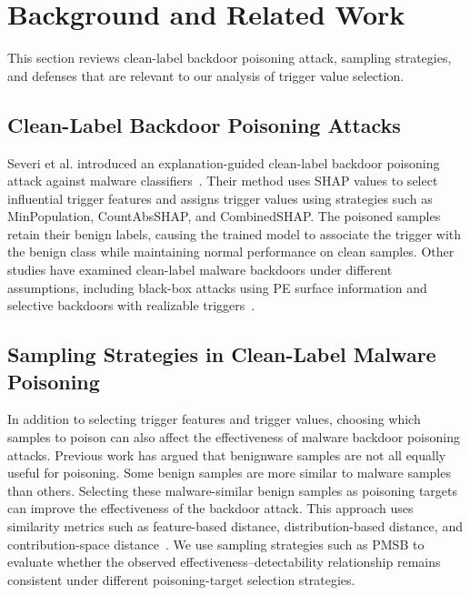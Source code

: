 \section{Background and Related Work}
This section reviews clean-label backdoor poisoning attack, sampling strategies, and defenses that are relevant to our analysis of trigger value selection.

\subsection{Clean-Label Backdoor Poisoning Attacks}
Severi et al. introduced an explanation-guided clean-label backdoor poisoning attack against malware classifiers~\cite{severi}.
Their method uses SHAP values to select influential trigger features and assigns trigger values using strategies such as MinPopulation, CountAbsSHAP, and CombinedSHAP.
The poisoned samples retain their benign labels, causing the trained model to associate the trigger with the benign class while maintaining normal performance on clean samples.
Other studies have examined clean-label malware backdoors under different assumptions, including black-box attacks using PE surface information and selective backdoors with realizable triggers~\cite{zheng_clean_label,jigsaw}.

\subsection{Sampling Strategies in Clean-Label Malware Poisoning}
In addition to selecting trigger features and trigger values, choosing which samples to poison can also affect the effectiveness of malware backdoor poisoning attacks.
Previous work has argued that benignware samples are not all equally useful for poisoning. Some benign samples are more similar to malware samples than others.
Selecting these malware-similar benign samples as poisoning targets can improve the effectiveness of the backdoor attack.
This approach uses similarity metrics such as feature-based distance, distribution-based distance, and contribution-space distance~\cite{pmsb}.
We use sampling strategies such as PMSB to evaluate whether the observed effectiveness--detectability relationship remains consistent under different poisoning-target selection strategies.

